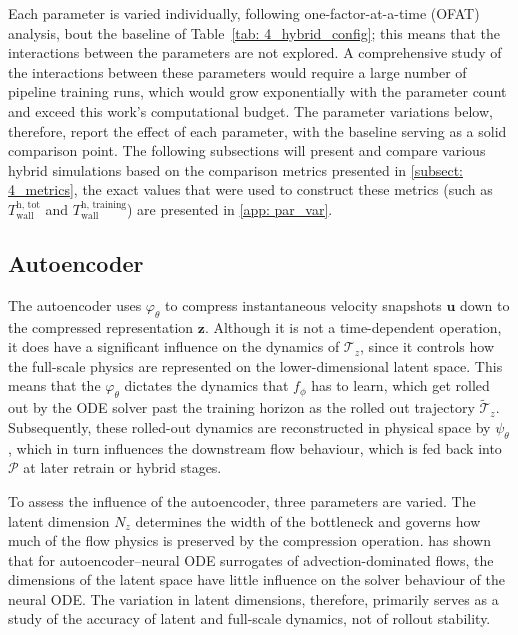 Each parameter is varied individually, following one-factor-at-a-time (OFAT) analysis, bout the baseline of Table~\ref{tab: 4_hybrid_config}; this means that the interactions between the parameters are not explored. A comprehensive study of the interactions between these parameters would require a large number of pipeline training runs, which would grow exponentially with the parameter count and exceed this work's computational budget. The parameter variations below, therefore, report the effect of each parameter, with the baseline serving as a solid comparison point. The following subsections will present and compare various hybrid simulations based on the comparison metrics presented in \ref{subsect: 4_metrics}, the exact values that were used to construct these metrics (such as $T^\text{h, tot}_\text{wall}$ and $T^\text{h, training}_\text{wall}$) are presented in \autoref{app: par_var}.


\subsection{Autoencoder}
\label{subsect: 4_ae_parameters}

The autoencoder uses $\varphi_\theta$ to compress instantaneous velocity snapshots $\mathbf{u}$ down to the compressed representation $\mathbf{z}$. Although it is not a time-dependent operation, it does have a significant influence on the dynamics of $\boldsymbol{\mathcal{T}}_z$, since it controls how the full-scale physics are represented on the lower-dimensional latent space. This means that the $\varphi_\theta$ dictates the dynamics that $f_\phi$ has to learn, which get rolled out by the ODE solver past the training horizon as the rolled out trajectory $\tilde{\boldsymbol{\mathcal{T}}}_z$. Subsequently, these rolled-out dynamics are reconstructed in physical space by $\psi_\theta$, which in turn influences the downstream flow behaviour, which is fed back into $\mathcal{P}$ at later retrain or hybrid stages. 

To assess the influence of the autoencoder, three parameters are varied. The latent dimension $N_z$ determines the width of the bottleneck and governs how much of the flow physics is preserved by the compression operation. \textcite{Nair2024} has shown that for autoencoder--neural ODE surrogates of advection-dominated flows, the dimensions of the latent space have little influence on the solver behaviour of the neural ODE. The variation in latent dimensions, therefore, primarily serves as a study of the accuracy of latent and full-scale dynamics, not of rollout stability. 


